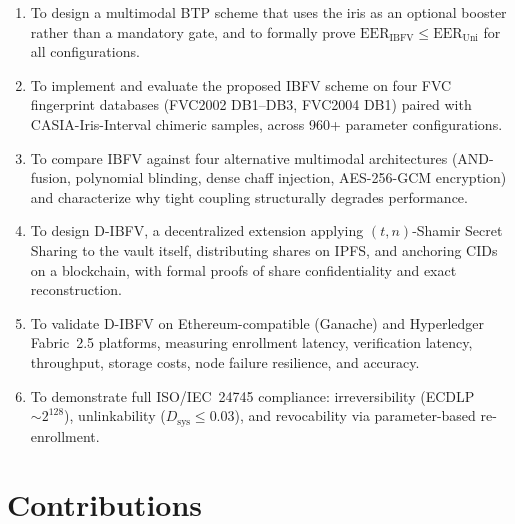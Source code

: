 \begin{enumerate}
  \item To design a multimodal BTP scheme that uses the iris as an optional
  booster rather than a mandatory gate, and to formally prove $\mathrm{EER_{IBFV}}
  \leq \mathrm{EER_{Uni}}$ for all configurations.

  \item To implement and evaluate the proposed IBFV scheme on four FVC fingerprint
  databases (FVC2002 DB1--DB3, FVC2004 DB1) paired with CASIA-Iris-Interval
  chimeric samples, across 960+ parameter configurations.

  \item To compare IBFV against four alternative multimodal architectures
  (AND-fusion, polynomial blinding, dense chaff injection, AES-256-GCM
  encryption) and characterize why tight coupling structurally degrades performance.

  \item To design D-IBFV, a decentralized extension applying $(t,n)$-Shamir Secret
  Sharing to the vault itself, distributing shares on IPFS, and anchoring CIDs on
  a blockchain, with formal proofs of share confidentiality and exact reconstruction.

  \item To validate D-IBFV on Ethereum-compatible (Ganache) and Hyperledger
  Fabric~2.5 platforms, measuring enrollment latency, verification latency,
  throughput, storage costs, node failure resilience, and accuracy.

  \item To demonstrate full ISO/IEC~24745 compliance: irreversibility (ECDLP
  $\sim\!2^{128}$), unlinkability ($D_{\mathrm{sys}} \leq 0.03$), and
  revocability via parameter-based re-enrollment.
\end{enumerate}

\section{Contributions}

